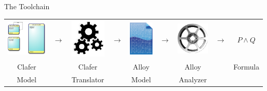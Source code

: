 \documentclass[table,15pt,t]{beamer}
\newcounter{i}
\begin{document}
\begin{frame}{The Toolchain}
  \begin{tabularx}{\textwidth}{ccccccccc}
    \includegraphics[scale=0.06]{figs/model}
    & $\rightarrow$
    & \includegraphics[scale=1]{figs/gears}
    & $\rightarrow$
    & \includegraphics[scale=0.3]{figs/document}
    & $\rightarrow$
    & \includegraphics[scale=0.7]{figs/alloy}
    & $\rightarrow$
    & $P \land Q$
    \\
    Clafer & & Clafer & & Alloy & & Alloy & & Formula\\
    Model & & Translator & & Model & & Analyzer & &
  \end{tabularx}
\end{frame}
\end{document}

